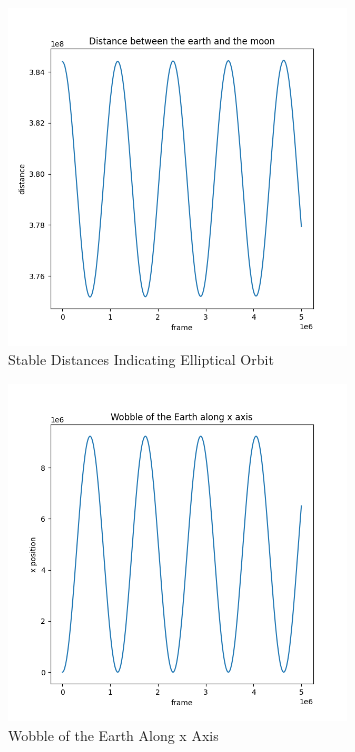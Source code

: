 \documentclass[a4paper,12pt]{article}
\begin{document}
\begin{figure}[H]
    \centering
    \includegraphics[width=0.8\textwidth]{./distances.png}
    \caption{Stable Distances Indicating Elliptical Orbit}
\end{figure}
\begin{figure}[H]
    \centering
    \includegraphics[width=0.8\textwidth]{./x_fluctuations.png}
    \caption{Wobble of the Earth Along x Axis}
\end{figure}
\end{document}

